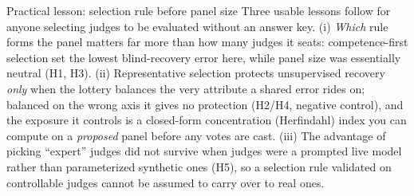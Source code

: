 \documentclass[
  ignorenonframetext,
]{beamer}
\begin{document}
\begin{frame}[allowframebreaks]{Practical lesson: selection rule before
panel size}
\protect{}\label{practical-lesson-selection-rule-before-panel-size}
Three usable lessons follow for anyone selecting judges to be evaluated
without an answer key. (i) \emph{Which} rule forms the panel matters far
more than how many judges it seats: competence-first selection set the
lowest blind-recovery error here, while panel size was essentially
neutral (H1, H3). (ii) Representative selection protects unsupervised
recovery \emph{only} when the lottery balances the very attribute a
shared error rides on; balanced on the wrong axis it gives no protection
(H2/H4, negative control), and the exposure it controls is a closed-form
concentration (Herfindahl) index you can compute on a \emph{proposed}
panel before any votes are cast. (iii) The advantage of picking
``expert'' judges did not survive when judges were a prompted live model
rather than parameterized synthetic ones (H5), so a selection rule
validated on controllable judges cannot be assumed to carry over to real
ones.
\end{frame}
\end{document}
